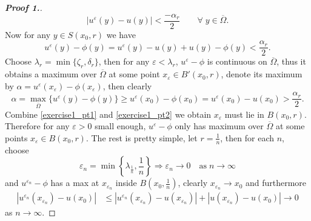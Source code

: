 \documentclass[12pt, oneside]{amsart}  	%
\begin{document}
\begin{proof}[\textbf{Proof 1.}]
\begin{equation*}
|u^\varepsilon(y) - u(y)| < \frac{-\alpha_r}{2} \qquad\forall\;y\in \overline{\Omega}.
\end{equation*}
Now for any $y\in S(x_0,r)$ we have
\begin{equation}\label{exercise1_pt1}
u^\varepsilon(y) - \phi(y) = u^\varepsilon(y) - u(y)  + u(y) - \phi(y) < \frac{\alpha_r}{2}.
\end{equation}
Choose $\lambda_r = \min\{\zeta_r,\delta_r\}$, then for any $\varepsilon<\lambda_r$, $u^\varepsilon - \phi$ is continuous on $\overline{\Omega}$, thus it obtains a maximum over $\overline{\Omega}$ at some point $x_\varepsilon \in B'(x_0,r)$, denote its maximum by $\alpha = u^\varepsilon (x_\varepsilon) - \phi(x_\varepsilon)$, then clearly
\begin{equation}\label{exercise1_pt2}
\alpha = \max_{\overline{\Omega}} \{u^\varepsilon(y) - \phi(y)\} \geq u^\varepsilon(x_0) - \phi(x_0) = u^\varepsilon(x_0) - u(x_0)  > \frac{\alpha_r}{2}.
\end{equation}
Combine \eqref{exercise1_pt1} and \eqref{exercise1_pt2} we obtain $x_\varepsilon$ must lie in $B(x_0,r)$. Therefore for any $\varepsilon>0$ small enough, $u^\varepsilon -\phi$ only has maximum over $\overline{\Omega}$ at some points $x_\varepsilon \in B(x_0,r)$. The rest is pretty simple, let $r = \frac{1}{n}$, then for each $n$, choose
\begin{equation*}
\varepsilon_n = \min\left\lbrace \lambda_{\frac{1}{n}},\frac{1}{n} \right\rbrace  \Longrightarrow \varepsilon_n \longrightarrow 0 \quad\text{as}\;n\longrightarrow\infty
\end{equation*}
and $u^{\varepsilon_n}- \phi$ has a max at $x_{\varepsilon_n}$ inside $B\left(x_0,\frac{1}{n}\right)$, clearly $x_{\varepsilon_n}\longrightarrow x_0$ and furthermore
\begin{align*}
\left|u^{\varepsilon_n}(x_{\varepsilon_n}) - u(x_0)\right|  &\leq \left|u^{\varepsilon_n}(x_{\varepsilon_n}) - u(x_{\varepsilon_n})\right|  + \left|u(x_{\varepsilon_n}) - u(x_0)\right|\longrightarrow 0
\end{align*}
as $n\longrightarrow \infty$.
\end{proof}
\end{document}
